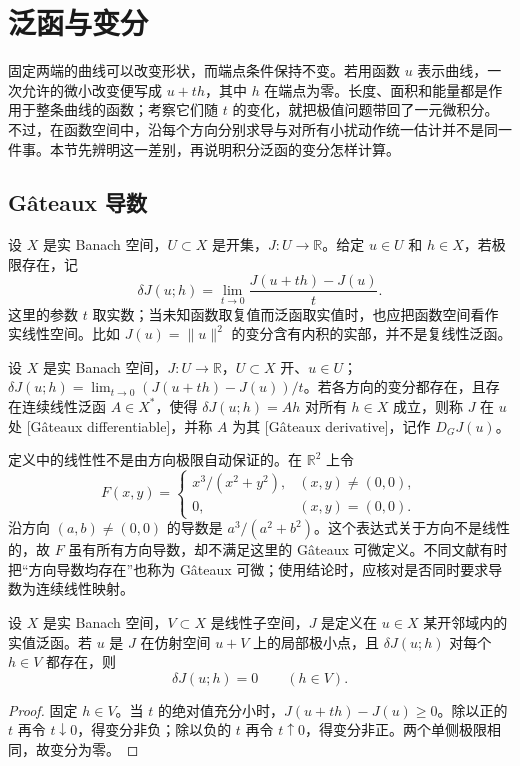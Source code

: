 \section{泛函与变分}
\label{b2:sec:1401}

固定两端的曲线可以改变形状，而端点条件保持不变。若用函数 \(u\) 表示曲线，一次允许的微小改变便写成 \(u+th\)，其中 \(h\) 在端点为零。长度、面积和能量都是作用于整条曲线的函数；考察它们随 \(t\) 的变化，就把极值问题带回了一元微积分。不过，在函数空间中，沿每个方向分别求导与对所有小扰动作统一估计并不是同一件事。本节先辨明这一差别，再说明积分泛函的变分怎样计算。

\subsection{Gâteaux 导数}
\label{b2:subsec:140101}

设 \(X\) 是实 Banach 空间，\(U\subset X\) 是开集，\(J:U\to\mathbb R\)。给定 \(u\in U\) 和 \(h\in X\)，若极限存在，记
\[
 \delta J(u;h)=\lim_{t\to0}\frac{J(u+th)-J(u)}{t}.
\]
这里的参数 \(t\) 取实数；当未知函数取复值而泛函取实值时，也应把函数空间看作实线性空间。比如 \(J(u)=\lVert u\rVert^2\) 的变分含有内积的实部，并不是复线性泛函。

\begin{definition}[Gâteaux 可微]
\label{b2:def:14-gateaux}
设 \(X\) 是实 Banach 空间，\(J:U\to\mathbb R\)，\(U\subset X\) 开、\(u\in U\)；\(\delta J(u;h)=\lim_{t\to0}(J(u+th)-J(u))/t\)。若各方向的变分都存在，且存在连续线性泛函 \(A\in X^*\)，使得 \(\delta J(u;h)=Ah\) 对所有 \(h\in X\) 成立，则称 \(J\) 在 \(u\) 处 [Gâteaux differentiable]，并称 \(A\) 为其 [Gâteaux derivative]，记作 \(D_GJ(u)\)。
\end{definition}

定义中的线性性不是由方向极限自动保证的。在 \(\mathbb R^2\) 上令
\[
 F(x,y)=\begin{cases}x^3/(x^2+y^2),&(x,y)\ne(0,0),\\0,&(x,y)=(0,0).\end{cases}
\]
沿方向 \((a,b)\ne(0,0)\) 的导数是 \(a^3/(a^2+b^2)\)。这个表达式关于方向不是线性的，故 \(F\) 虽有所有方向导数，却不满足这里的 Gâteaux 可微定义。不同文献有时把“方向导数均存在”也称为 Gâteaux 可微；使用结论时，应核对是否同时要求导数为连续线性映射。

\begin{proposition}[极小点的必要条件]
\label{b2:prop:14-gateaux-minimum}
设 \(X\) 是实 Banach 空间，\(V\subset X\) 是线性子空间，\(J\) 是定义在 \(u\in X\) 某开邻域内的实值泛函。若 \(u\) 是 \(J\) 在仿射空间 \(u+V\) 上的局部极小点，且 \(\delta J(u;h)\) 对每个 \(h\in V\) 都存在，则
\[\delta J(u;h)=0\qquad(h\in V).\]
\end{proposition}
\begin{proof}
固定 \(h\in V\)。当 \(t\) 的绝对值充分小时，\(J(u+th)-J(u)\ge0\)。除以正的 \(t\) 再令 \(t\downarrow0\)，得变分非负；除以负的 \(t\) 再令 \(t\uparrow0\)，得变分非正。两个单侧极限相同，故变分为零。
\end{proof}

